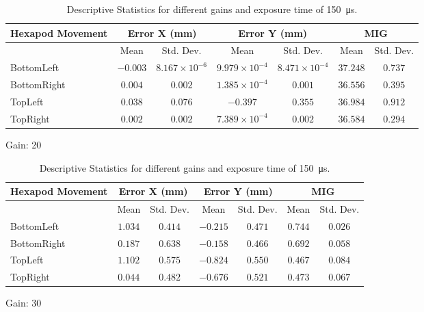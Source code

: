 \begin{table}[h]
    \centering
    \begin{subtable}{\textwidth}
        \centering
        \footnotesize
        \begin{tabular}{lcccccc}
            \toprule
            Hexapod Movement & \multicolumn{2}{c}{Error X (mm)} & \multicolumn{2}{c}{Error Y (mm)} & \multicolumn{2}{c}{MIG}  \\
            \midrule
            & \multicolumn{1}{c}{Mean} & \multicolumn{1}{c}{Std. Dev.} & \multicolumn{1}{c}{Mean} & \multicolumn{1}{c}{Std. Dev.} & \multicolumn{1}{c}{Mean} & \multicolumn{1}{c}{Std. Dev.} \\
            \midrule
            \textsf{BottomLeft} & $-0.003$ & $8.167\times10^{-6}$ & $9.979\times10^{-4}$ & $8.471\times10^{-4}$ & $37.248$ & $0.737$ \\
            \textsf{BottomRight} & $0.004$ & $0.002$ & $1.385\times10^{-4}$ & $0.001$ & $36.556$ & $0.395$ \\
            \textsf{TopLeft} & $0.038$ & $0.076$ & $-0.397$ & $0.355$ & $36.984$ & $0.912$ \\
            \textsf{TopRight} & $0.002$ & $0.002$ & $7.389\times10^{-4}$ & $0.002$ & $36.584$ & $0.294$ \\
            \bottomrule
        \end{tabular}
        \caption{Gain: 20}
    \end{subtable}

    \vspace{10pt}

    \begin{subtable}{\textwidth}
        \centering
        \footnotesize
        \begin{tabular}{lcccccc}
            \toprule
            Hexapod Movement & \multicolumn{2}{c}{Error X (mm)} & \multicolumn{2}{c}{Error Y (mm)} & \multicolumn{2}{c}{MIG}  \\
            \midrule
            & \multicolumn{1}{c}{Mean} & \multicolumn{1}{c}{Std. Dev.} & \multicolumn{1}{c}{Mean} & \multicolumn{1}{c}{Std. Dev.} & \multicolumn{1}{c}{Mean} & \multicolumn{1}{c}{Std. Dev.} \\
            \midrule
            \textsf{BottomLeft} & $1.034$ & $0.414$ & $-0.215$ & $0.471$ & $0.744$ & $0.026$ \\
            \textsf{BottomRight} & $0.187$ & $0.638$ & $-0.158$ & $0.466$ & $0.692$ & $0.058$ \\
            \textsf{TopLeft} & $1.102$ & $0.575$ & $-0.824$ & $0.550$ & $0.467$ & $0.084$ \\
            \textsf{TopRight} & $0.044$ & $0.482$ & $-0.676$ & $0.521$ & $0.473$ & $0.067$ \\
            \bottomrule
        \end{tabular}
        \caption{Gain: 30}
    \end{subtable}

    \caption{Descriptive Statistics for different gains and exposure time of \SI{150}{\micro\second}.}
    \label{table:stats_matrix_gain_20}
\end{table}

